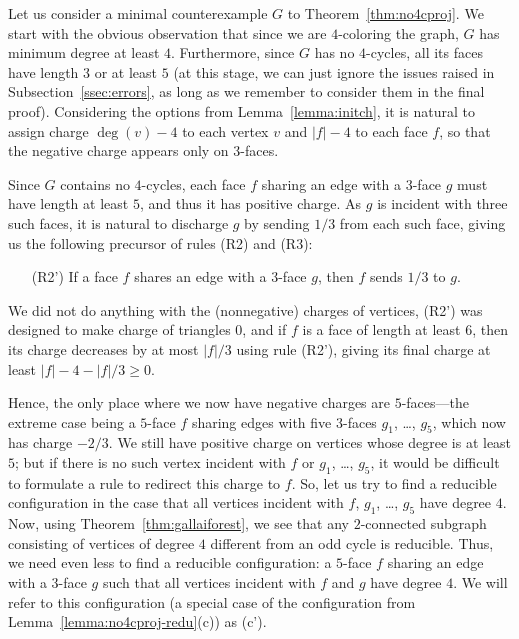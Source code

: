 \documentclass[12pt,twoside,openright,a4paper]{book}
\begin{document}
Let us consider a minimal counterexample $G$ to Theorem~\ref{thm:no4cproj}.
We start with the obvious observation that since we are $4$-coloring the graph, $G$ has minimum degree at least $4$.
Furthermore, since $G$ has no $4$-cycles, all its faces have length $3$ or at least $5$ (at this stage, we can just
ignore the issues raised in Subsection~\ref{ssec:errors}, as long as we remember to consider them in the final proof).
Considering the options from Lemma~\ref{lemma:initch}, it is natural to assign charge $\deg(v)-4$ to each vertex $v$
and $|f|-4$ to each face $f$, so that the negative charge appears only on $3$-faces.

Since $G$ contains no $4$-cycles, each face $f$ sharing an edge with a $3$-face $g$ must have length at least $5$, and thus it has positive charge.
As $g$ is incident with three such faces, it is natural to discharge $g$ by sending $1/3$ from each such face, giving
us the following precursor of rules (R2) and (R3):
\begin{itemize}
\item[(R2')] If a face $f$ shares an edge with a $3$-face $g$, then $f$ sends $1/3$ to $g$.
\end{itemize}
We did not do anything with the (nonnegative) charges of vertices, (R2') was designed to make charge of triangles $0$,
and if $f$ is a face of length at least $6$, then its charge decreases by at most $|f|/3$ using rule (R2'),
giving its final charge at least $|f|-4-|f|/3\ge 0$.

Hence, the only place where we now have negative charges are $5$-faces---the extreme case being a $5$-face $f$ sharing
edges with five $3$-faces $g_1$, \ldots, $g_5$, which now has charge $-2/3$.  We still have positive charge on vertices
whose degree is at least $5$; but if there is no such vertex incident with $f$ or $g_1$, \ldots, $g_5$, it would be difficult
to formulate a rule to redirect this charge to $f$.  So, let us try to find a reducible configuration in the case that
all vertices incident with $f$, $g_1$, \ldots, $g_5$ have degree $4$.  Now, using Theorem~\ref{thm:gallaiforest}, we see that
any $2$-connected subgraph consisting of vertices of degree $4$ different from an odd cycle is reducible.  Thus, we need even
less to find a reducible configuration: a $5$-face $f$ sharing an edge with a $3$-face $g$ such that all vertices incident with $f$
and $g$ have degree $4$.  We will refer to this configuration (a special case of the configuration from Lemma~\ref{lemma:no4cproj-redu}(c))
as (c').
\end{document}
